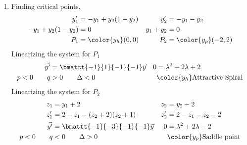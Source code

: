 \begin{enumerate}
    \item Finding critical points,
          \begin{align}
              y_1'                & = -y_1 + y_2(1 - y_2) &
              y_2'                & = -y_1 - y_2            \\
              -y_1 + y_2(1 - y_2) & = 0                   &
              y_1 + y_2           & = 0                     \\
              P_1                 & = \color{y_h}(0, 0)   &
              P_2                 & = \color{y_p} (-2, 2)
          \end{align}
          Linearizing the system for $ P_1 $
          \begin{align}
              \vec{y'}       & = \bmattt{-1}{1}{-1}{-1} \vec{y}     &
              0              & = \lambda^{2} + 2\lambda + 2           \\
              p < 0 \qquad q & > 0 \qquad \Delta < 0                &
                             & \color{y_h} \text{Attractive Spiral}
          \end{align}
          Linearizing the system for $ P_2 $
          \begin{align}
              z_1            & = y_1 + 2                         &
              z_2            & = y_2 - 2                           \\
              z_1'           & = 2 - z_1 - (z_2 + 2)(z_2 + 1)    &
              z_2'           & = 2 - z_1 - z_2 - 2                 \\
              \vec{y'}       & = \bmattt{-1}{-3}{-1}{-1} \vec{y} &
              0              & = \lambda^{2} + 2\lambda - 2        \\
              p < 0 \qquad q & < 0 \qquad \Delta > 0             &
                             & \color{y_p} \text{Saddle point}
          \end{align}


\end{enumerate}
